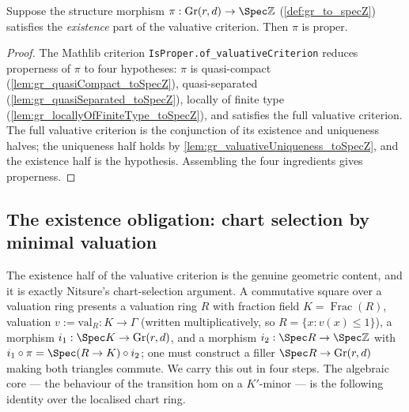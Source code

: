 \begin{lemma}

  \label{lem:gr_isProper_of_valuativeExistence}
  Suppose the structure morphism \(\pi : \mathrm{Gr}(r,d) \to \Spec \mathbb{Z}\)
  (\cref{def:gr_to_specZ}) satisfies the \emph{existence} part of the valuative
  criterion. Then \(\pi\) is proper.
\end{lemma}
\begin{proof}
    \leanok
  The Mathlib criterion \texttt{IsProper.of\_valuativeCriterion} reduces properness
  of \(\pi\) to four hypotheses: \(\pi\) is quasi-compact
  (\cref{lem:gr_quasiCompact_toSpecZ}), quasi-separated
  (\cref{lem:gr_quasiSeparated_toSpecZ}), locally of finite type
  (\cref{lem:gr_locallyOfFiniteType_toSpecZ}), and satisfies the full valuative
  criterion. The full valuative criterion is the conjunction of its existence and
  uniqueness halves; the uniqueness half holds by
  \cref{lem:gr_valuativeUniqueness_toSpecZ}, and the existence half is the
  hypothesis. Assembling the four ingredients gives properness.
\end{proof}

\subsection*{The existence obligation: chart selection by minimal valuation}

The existence half of the valuative criterion is the genuine geometric content,
and it is exactly Nitsure's chart-selection argument. A commutative square over a
valuation ring presents a valuation ring \(R\) with fraction field \(K =
\operatorname{Frac}(R)\), valuation \(v := \mathrm{val}_R : K \to \Gamma\) (written
multiplicatively, so \(R = \{x : v(x) \le 1\}\)), a morphism \(i_1 : \Spec K \to
\mathrm{Gr}(r,d)\), and a morphism \(i_2 : \Spec R \to \Spec \mathbb{Z}\) with
\(i_1 \circ \pi = \Spec(R \to K) \circ i_2\); one must construct a filler
\(\Spec R \to \mathrm{Gr}(r,d)\) making both triangles commute. We carry this out
in four steps. The algebraic core --- the behaviour of the transition hom on a
\(K'\)-minor --- is the following identity over the localised chart ring.

